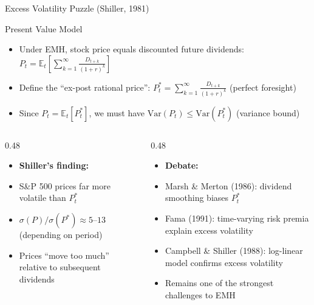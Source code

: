 \documentclass[9pt, aspectratio=169, t]{beamer}
\theoremstyle{definition}
\newenvironment{cminipage}[1]{%
    \par\noindent\hfill\begin{minipage}{#1}\ignorespaces
}{%
    \end{minipage}\hfill\null\par
}
\newcommand{\E}{\mathbb{E}}
\newcommand{\Var}{\text{Var}}
\begin{document}
\begin{frame}{Excess Volatility Puzzle (Shiller, 1981)}
\begin{cminipage}{0.95\textwidth}
\small
\begin{block}{Present Value Model}
\begin{itemize}\setlength{\itemsep}{0pt}
    \item Under EMH, stock price equals discounted future dividends: $P_t = \E_t\left[\sum_{k=1}^{\infty}\frac{D_{t+k}}{(1+r)^k}\right]$
    \item Define the ``ex-post rational price'': $P_t^* = \sum_{k=1}^{\infty}\frac{D_{t+k}}{(1+r)^k}$ (perfect foresight)
    \item Since $P_t = \E_t[P_t^*]$, we must have $\Var(P_t) \leq \Var(P_t^*)$ (variance bound)
\end{itemize}
\end{block}

\begin{columns}[T]
\begin{column}{0.48\textwidth}
\begin{itemize}\setlength{\itemsep}{0pt}
    \item \textbf{Shiller's finding:}
    \item S\&P 500 prices far more volatile than $P_t^*$
    \item $\sigma(P)/\sigma(P^*) \approx 5$--$13$ (depending on period)
    \item Prices ``move too much'' relative to subsequent dividends
\end{itemize}
\end{column}
\begin{column}{0.48\textwidth}
\begin{itemize}\setlength{\itemsep}{0pt}
    \item \textbf{Debate:}
    \item Marsh \& Merton (1986): dividend smoothing biases $P_t^*$
    \item Fama (1991): time-varying risk premia explain excess volatility
    \item Campbell \& Shiller (1988): log-linear model confirms excess volatility
    \item Remains one of the strongest challenges to EMH
\end{itemize}
\end{column}
\end{columns}
\end{cminipage}
\end{frame}
\end{document}
